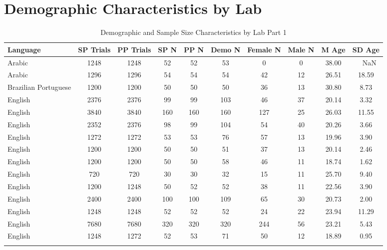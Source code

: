 \documentclass[
  man,floatsintext]{apa7}
\begin{document}
\hypertarget{demographic-characteristics-by-lab}{%
\section{Demographic Characteristics by Lab}\label{demographic-characteristics-by-lab}}

\begin{table}[tbp]

\begin{center}
\begin{threeparttable}

\caption{\label{tab:print-part1}Demographic and Sample Size Characteristics by Lab Part 1}

\footnotesize{

\begin{tabular}{lccccccccc}
\toprule
Language & SP 
Trials & PP 
Trials & SP 
N & PP 
N & Demo 
N & Female 
N & Male 
N & M 
Age & SD 
Age\\
\midrule
Arabic & 1248 & 1248 & 52 & 52 & 53 & 0 & 0 & 38.00 & \ \ NaN\\
Arabic & 1296 & 1296 & 54 & 54 & 54 & 42 & 12 & 26.51 & 18.59\\
Brazilian Portuguese & 1200 & 1200 & 50 & 50 & 50 & 36 & 13 & 30.80 & 8.73\\
English & 2376 & 2376 & 99 & 99 & 103 & 46 & 37 & 20.14 & 3.32\\
English & 3840 & 3840 & 160 & 160 & 160 & 127 & 25 & 26.03 & 11.55\\
English & 2352 & 2376 & 98 & 99 & 104 & 54 & 40 & 20.26 & 3.66\\
English & 1272 & 1272 & 53 & 53 & 76 & 57 & 13 & 19.96 & 3.90\\
English & 1200 & 1200 & 50 & 50 & 51 & 37 & 13 & 20.14 & 2.46\\
English & 1200 & 1200 & 50 & 50 & 58 & 46 & 11 & 18.74 & 1.62\\
English & 720 & 720 & 30 & 30 & 32 & 15 & 11 & 25.70 & 9.40\\
English & 1200 & 1248 & 50 & 52 & 52 & 38 & 11 & 22.56 & 3.90\\
English & 2400 & 2400 & 100 & 100 & 109 & 65 & 30 & 20.73 & 2.00\\
English & 1248 & 1248 & 52 & 52 & 52 & 24 & 22 & 23.94 & 11.29\\
English & 7680 & 7680 & 320 & 320 & 320 & 244 & 56 & 23.21 & 5.43\\
English & 1248 & 1272 & 52 & 53 & 71 & 50 & 12 & 18.89 & 0.95\\
\bottomrule
\addlinespace
\end{tabular}

}
\end{threeparttable}
\end{center}
\end{table}
\end{document}
